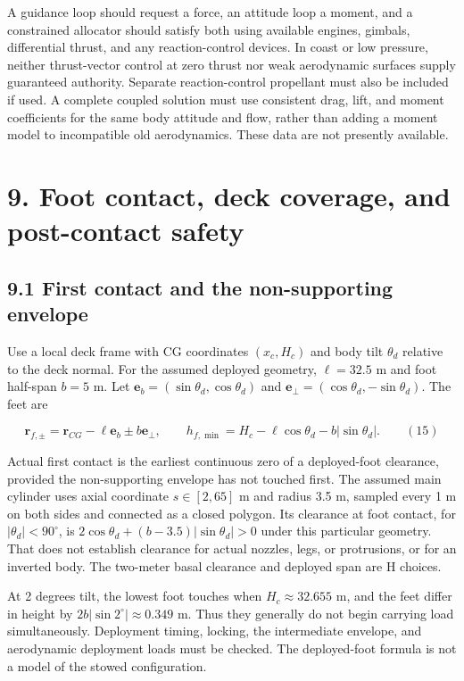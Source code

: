 \documentclass[
  11pt,
  a4paper,
]{article}
\begin{document}
A guidance loop should request a force, an attitude loop a moment, and a
constrained allocator should satisfy both using available engines,
gimbals, differential thrust, and any reaction-control devices. In coast
or low pressure, neither thrust-vector control at zero thrust nor weak
aerodynamic surfaces supply guaranteed authority. Separate
reaction-control propellant must also be included if used. A complete
coupled solution must use consistent drag, lift, and moment coefficients
for the same body attitude and flow, rather than adding a moment model
to incompatible old aerodynamics. These data are not presently
available.

\section{9. Foot contact, deck coverage, and post-contact
safety}\label{foot-contact-deck-coverage-and-post-contact-safety}

\subsection{9.1 First contact and the non-supporting
envelope}\label{first-contact-and-the-non-supporting-envelope}

Use a local deck frame with CG coordinates \((x_c,H_c)\) and body tilt
\(\theta_d\) relative to the deck normal. For the assumed deployed
geometry, \(\ell=32.5\) m and foot half-span \(b=5\) m. Let
\(\mathbf e_b=(\sin\theta_d,\cos\theta_d)\) and
\(\mathbf e_\perp=(\cos\theta_d,-\sin\theta_d)\). The feet are

\[ \mathbf r_{f,\pm}=\mathbf r_{CG}-\ell\mathbf e_b\pm b\mathbf e_\perp,\qquad h_{f,\min}=H_c-\ell\cos\theta_d-b|\sin\theta_d|. \qquad (15) \]

Actual first contact is the earliest continuous zero of a deployed-foot
clearance, provided the non-supporting envelope has not touched first.
The assumed main cylinder uses axial coordinate \(s\in[2,65]\) m and
radius 3.5 m, sampled every 1 m on both sides and connected as a closed
polygon. Its clearance at foot contact, for \(|\theta_d|<90^\circ\), is
\(2\cos\theta_d+(b-3.5)|\sin\theta_d|>0\) under this particular
geometry. That does not establish clearance for actual nozzles, legs, or
protrusions, or for an inverted body. The two-meter basal clearance and
deployed span are H choices.

At 2 degrees tilt, the lowest foot touches when \(H_c\approx32.655\) m,
and the feet differ in height by \(2b|\sin2^\circ|\approx0.349\) m. Thus
they generally do not begin carrying load simultaneously. Deployment
timing, locking, the intermediate envelope, and aerodynamic deployment
loads must be checked. The deployed-foot formula is not a model of the
stowed configuration.
\end{document}
